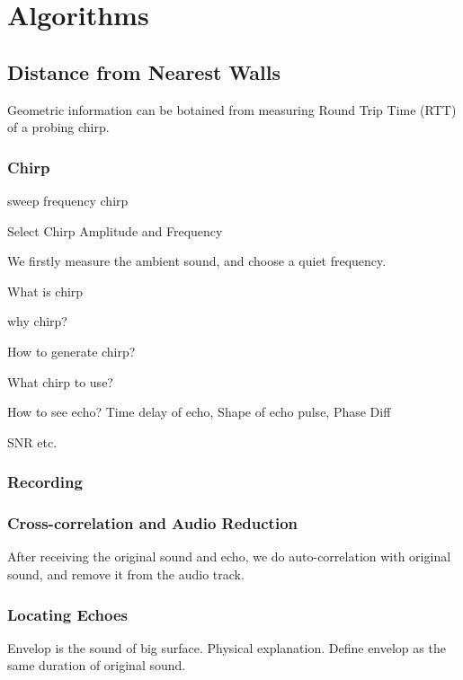 \section{Algorithms}
\label{sec:algo}



\subsection{Distance from Nearest Walls}

Geometric information can be botained from measuring Round Trip Time (RTT)
of a probing chirp. 

\subsubsection{Chirp}


sweep frequency chirp


Select Chirp Amplitude and Frequency

We firstly measure the ambient sound, and choose a quiet frequency.


What is chirp


why chirp?


How to generate chirp?


What chirp to use?


How to see echo? Time delay of echo, Shape of echo pulse, Phase Diff


SNR etc.


\subsubsection{Recording}

\subsubsection{Cross-correlation and Audio Reduction}

After receiving the original sound and echo, we do auto-correlation with original sound,
and remove it from the audio track.



\subsubsection{Locating Echoes}

Envelop is the sound of big surface. Physical explanation. 
Define envelop as the same duration of original sound.



